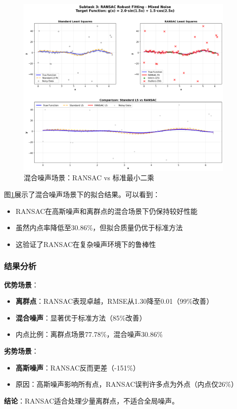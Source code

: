 \documentclass[a4paper,12pt]{article}
\theoremstyle{definition}
\begin{document}
\begin{figure}[H]
\centering
\includegraphics[width=0.95\textwidth]{results/task2/subtask3/comparison_mixed_noise.png}
\caption{混合噪声场景：RANSAC vs 标准最小二乘}
\label{fig:task2_subtask3_mixed}
\end{figure}

图\ref{fig:task2_subtask3_mixed}展示了混合噪声场景下的拟合结果。可以看到：
\begin{itemize}
    \item RANSAC在高斯噪声和离群点的混合场景下仍保持较好性能
    \item 虽然内点率降低至30.86\%，但拟合质量仍优于标准方法
    \item 这验证了RANSAC在复杂噪声环境下的鲁棒性
\end{itemize}

\subsubsection{结果分析}

\begin{tcolorbox}[enhanced,colback=green!5!white,colframe=green!50!black,title=RANSAC性能评估]

\textbf{优势场景}：
\begin{itemize}
    \item \textbf{离群点}：RANSAC表现卓越，RMSE从1.30降至0.01（99\%改善）
    \item \textbf{混合噪声}：显著优于标准方法（85\%改善）
    \item 内点比例：离群点场景77.78\%，混合噪声30.86\%
\end{itemize}

\textbf{劣势场景}：
\begin{itemize}
    \item \textbf{高斯噪声}：RANSAC反而更差（-151\%）
    \item 原因：高斯噪声影响所有点，RANSAC误判许多点为外点（内点仅26\%）
\end{itemize}

\textbf{结论}：RANSAC适合处理少量离群点，不适合全局噪声。

\end{tcolorbox}
\end{document}
